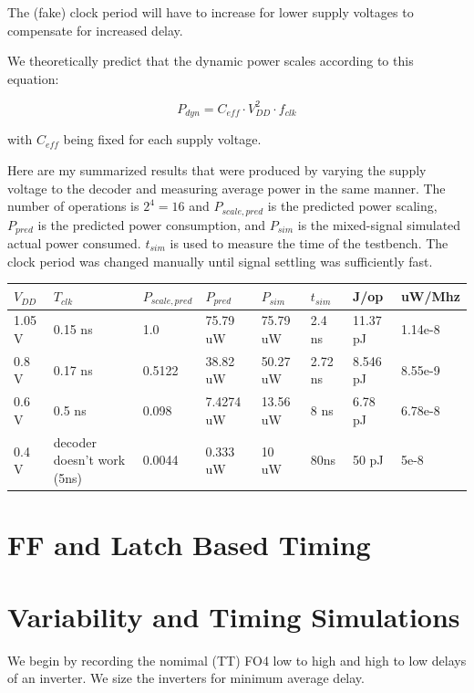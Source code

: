 \documentclass[11pt]{article}
\begin{document}
The (fake) clock period will have to increase for lower supply voltages to compensate for increased delay.

We theoretically predict that the dynamic power scales according to this equation:

\begin{equation}
	P_{dyn} = C_{eff} \cdot V_{DD}^2 \cdot f_{clk}
\end{equation}

with $C_{eff}$ being fixed for each supply voltage. 

Here are my summarized results that were produced by varying the supply voltage to the decoder and measuring average power in the same manner. The number of operations is $2^4 = 16$ and $P_{scale,pred}$ is the predicted power scaling, $P_{pred}$ is the predicted power consumption, and $P_{sim}$ is the mixed-signal simulated actual power consumed. $t_{sim}$ is used to measure the time of the testbench. The clock period was changed manually until signal settling was sufficiently fast.

\begin{center}
\begin{tabular}{| l | l | l | l | l | l | l | l |} \hline
	$V_{DD}$ & $T_{clk}$ & $P_{scale,pred}$ & $P_{pred}$ & $P_{sim}$ & $t_{sim}$ & J/op & uW/Mhz \\ \hline
	1.05 V & 0.15 ns & 1.0 & 75.79 uW & 75.79 uW & 2.4 ns & 11.37 pJ & 1.14e-8 \\ \hline
	0.8 V & 0.17 ns & 0.5122 & 38.82 uW & 50.27 uW & 2.72 ns & 8.546 pJ & 8.55e-9\\ \hline
	0.6 V & 0.5 ns & 0.098 & 7.4274 uW & 13.56 uW & 8 ns & 6.78 pJ & 6.78e-8 \\ \hline
	0.4 V & decoder doesn't work (5ns) & 0.0044 & 0.333 uW & 10 uW & 80ns & 50 pJ &  5e-8 \\ \hline
\end{tabular}
\end{center}

\section{FF and Latch Based Timing}

\section{Variability and Timing Simulations}

We begin by recording the nomimal (TT) FO4 low to high and high to low delays of an inverter. We size the inverters for minimum average delay.
\end{document}
